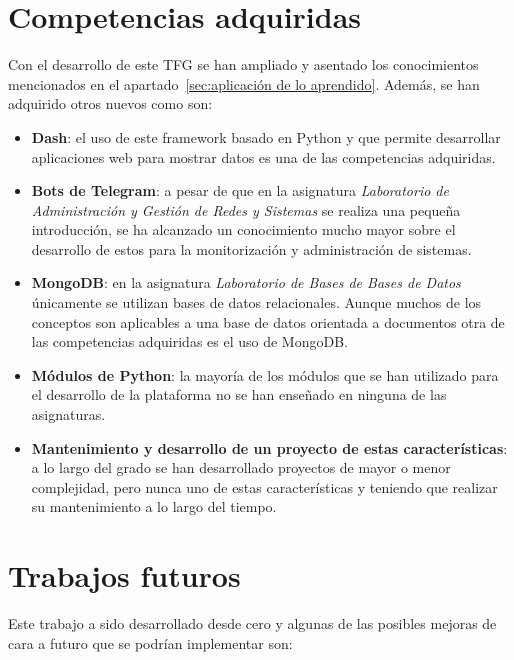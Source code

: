 \documentclass[a4paper, 12pt, oneside]{book}
\begin{document}
\section{Competencias adquiridas}
\label{sec:competencias adquiridas}

Con el desarrollo de este TFG se han ampliado y asentado los conocimientos mencionados en el apartado~\ref{sec:aplicación de lo aprendido}. Además, se han adquirido otros nuevos como son:

\begin{itemize}
\item \textbf{Dash}: el uso de este framework basado en Python y que permite desarrollar aplicaciones web para mostrar datos es una de las competencias adquiridas.

\item \textbf{Bots de Telegram}: a pesar de que en la asignatura \textit{Laboratorio de Administración y Gestión de Redes y Sistemas} se realiza una pequeña introducción, se ha alcanzado un conocimiento mucho mayor sobre el desarrollo de estos para la monitorización y administración de sistemas.

\item \textbf{MongoDB}: en la asignatura \textit{Laboratorio de Bases de Bases de Datos} únicamente se utilizan bases de datos relacionales. Aunque muchos de los conceptos son aplicables a una base de datos orientada a documentos otra de las competencias adquiridas es el uso de MongoDB.

\item \textbf{Módulos de Python}: la mayoría de los módulos que se han utilizado para el desarrollo de la plataforma no se han enseñado en ninguna de las asignaturas. 

\item \textbf{Mantenimiento y desarrollo de un proyecto de estas características}: a lo largo del grado se han desarrollado proyectos de mayor o menor complejidad, pero nunca uno de estas características y teniendo que realizar su mantenimiento a lo largo del tiempo.

\end{itemize}


\section{Trabajos futuros}
\label{sec:trabajos futuros}

Este trabajo a sido desarrollado desde cero y algunas de las posibles mejoras de cara a futuro que se podrían implementar son:
\end{document}

